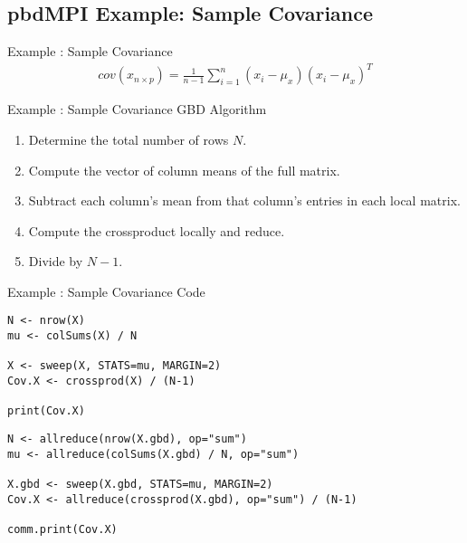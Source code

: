 \subsection{pbdMPI Example: Sample Covariance}

\begin{frame}
  \begin{block}{Example \countex :  Sample Covariance}\pause
  \begin{align*}
    cov(x_{n\times p}) = \frac{1}{n-1}\sum_{i=1}^n\left(x_i-\mu_x\right)\left(x_i-\mu_x\right)^T
  \end{align*}
  \end{block}
\end{frame}


\begin{frame}
  \begin{block}{Example \showex :  Sample Covariance GBD Algorithm}\pause
    \begin{enumerate}
     \item Determine the total number of rows $N$.
     \item Compute the vector of column means of the full matrix.
     \item Subtract each column's mean from that column's entries in each local matrix.
     \item Compute the crossproduct locally and reduce.
     \item Divide by $N-1$.
    \end{enumerate}
  \end{block}
\end{frame}


\begin{frame}
  \begin{exampleblock}{Example \showex :  Sample Covariance Code}\pause
\begin{lstlisting}[title=Serial Code]
N <- nrow(X)
mu <- colSums(X) / N

X <- sweep(X, STATS=mu, MARGIN=2)
Cov.X <- crossprod(X) / (N-1)

print(Cov.X)
\end{lstlisting}
  
\begin{lstlisting}[title=Parallel Code]
N <- allreduce(nrow(X.gbd), op="sum")
mu <- allreduce(colSums(X.gbd) / N, op="sum")

X.gbd <- sweep(X.gbd, STATS=mu, MARGIN=2)
Cov.X <- allreduce(crossprod(X.gbd), op="sum") / (N-1)

comm.print(Cov.X)
\end{lstlisting}
  \end{exampleblock}
\end{frame}

